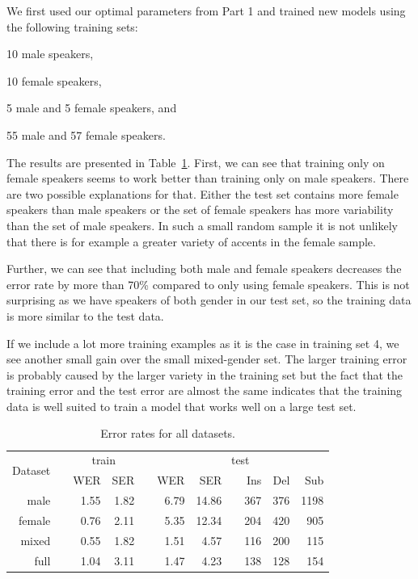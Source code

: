 \documentclass[twocolumn, 11pt]{article}
\begin{document}
We first used our optimal parameters from Part 1 and trained new models using
the following training sets:
\begin{inparaenum}[1)]
  \item 10 male speakers,
  \item 10 female speakers,
  \item 5 male and 5 female speakers, and
  \item 55 male and 57 female speakers.
\end{inparaenum}

The results are presented in Table~\ref{tab:wer-all}\@. First, we can see that training only
on female speakers seems to work better than training only on male speakers.
There are two possible explanations for that. Either the test set contains
more female speakers than male speakers or the set of female speakers has more
variability than the set of male speakers. In such a small random sample it is
not unlikely that there is for example a greater variety of accents in the
female sample.

Further, we can see that including both male and female speakers decreases the
error rate by more than 70\% compared to only using female speakers. This is not
surprising as we have speakers of both gender in our test set, so the training
data is more similar to the test data.

If we include a lot more training examples as it is the case in training set 4,
we see another small gain over the small mixed-gender set. The larger training
error is probably caused by the larger variety in the training set but the fact
that the training error and the test error are almost the same indicates that
the training data is well suited to train a model that works well on a large
test set.

\begin{table}\centering
  \begin{tabular}{@{}rcrrcrrcrrr@{}}\toprule%
    \multirow{2}{*}{Dataset} & \phantom{a} & \multicolumn{2}{c}{train}
    & \phantom{a} & \multicolumn{6}{c}{test} \\
    \cmidrule{3-4} \cmidrule{6-11}
    && WER & SER && WER & SER && Ins & Del & Sub\\ \midrule%
    male && 1.55 & 1.82 && 6.79 & 14.86 && 367 & 376 & 1198\\
    female && 0.76 & 2.11 && 5.35 & 12.34 && 204 & 420 & 905\\
    mixed && 0.55 & 1.82 && 1.51 & 4.57 && 116 & 200 & 115\\
    full && 1.04 & 3.11 && 1.47 & 4.23 && 138 & 128 & 154\\
    \bottomrule
  \end{tabular}
  \caption{Error rates for all datasets.}\label{tab:wer-all}
\end{table}
\end{document}
